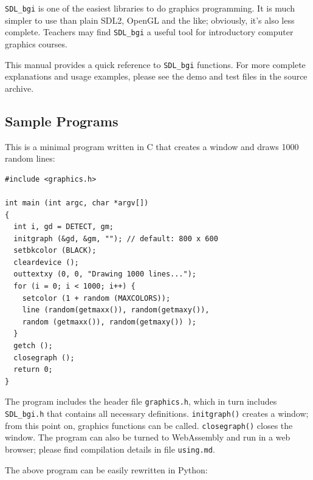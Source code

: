 \documentclass[a4paper,12pt]{article}
\newcommand{\ntt}[1]{\texttt{#1}}
\newcommand{\fn}[1]{\ntt{#1}}        %
\newcommand{\F}[1]{\ntt{#1}}         %
\newcommand{\file}[1]{\ntt{#1}}      %
\newcommand{\SDLbgi}{\texttt{SDL\_bgi}}
\begin{document}
\SDLbgi{} is one of the easiest libraries to do graphics programming.
It is much simpler to use than plain SDL2, OpenGL and the like;
obviously, it's also less complete. Teachers may find \SDLbgi{} a
useful tool for introductory computer graphics courses.

This manual provides a quick reference to \SDLbgi{} functions. For 
more complete explanations and usage examples, please see the
demo and test files in the source archive.


\subsection{Sample Programs}

This is a minimal program written in C that creates a window and draws
1000 random lines:


\begin{lstlisting}
#include <graphics.h>

int main (int argc, char *argv[])
{
  int i, gd = DETECT, gm;
  initgraph (&gd, &gm, ""); // default: 800 x 600
  setbkcolor (BLACK);
  cleardevice ();
  outtextxy (0, 0, "Drawing 1000 lines...");
  for (i = 0; i < 1000; i++) {
    setcolor (1 + random (MAXCOLORS));
    line (random(getmaxx()), random(getmaxy()),
    random (getmaxx()), random(getmaxy()) );
  }
  getch ();
  closegraph ();
  return 0;
}
\end{lstlisting}

The program includes the header file \F{graphics.h}, which in turn
includes \F{SDL\_bgi.h} that contains all necessary definitions.
\fn{initgraph()} creates a window; from this point on, graphics
functions can be called. \fn{closegraph()} closes the window. The
program can also be turned to WebAssembly and run in a web browser;
please find compilation details in file \file{using.md}.

The above program can be easily rewritten in Python:


\lstset{language=Python}
\end{document}
